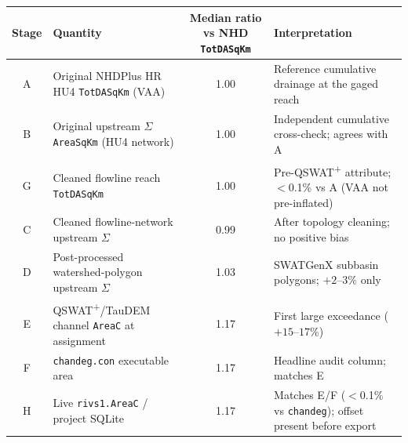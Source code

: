 \begin{tabular}{@{}clcp{5.0cm}@{}}
\toprule
Stage & Quantity & Median ratio vs NHD \texttt{TotDASqKm} & Interpretation \\
\midrule
A & Original NHDPlus HR HU4 \texttt{TotDASqKm} (VAA) & 1.00 & Reference cumulative drainage at the gaged reach \\
B & Original upstream $\Sigma$ \texttt{AreaSqKm} (HU4 network) & 1.00 & Independent cumulative cross-check; agrees with A \\
G & Cleaned flowline reach \texttt{TotDASqKm} & 1.00 & Pre-QSWAT\textsuperscript{+} attribute; $<$0.1\% vs A (VAA not pre-inflated) \\
C & Cleaned flowline-network upstream $\Sigma$ & 0.99 & After topology cleaning; no positive bias \\
D & Post-processed watershed-polygon upstream $\Sigma$ & 1.03 & SWATGenX subbasin polygons; $+2$--$3\%$ only \\
E & QSWAT\textsuperscript{+}/TauDEM channel \texttt{AreaC} at assignment & 1.17 & First large exceedance ($+15$--$17\%$) \\
F & \texttt{chandeg.con} executable area & 1.17 & Headline audit column; matches E \\
H & Live \texttt{rivs1.AreaC} / project SQLite & 1.17 & Matches E/F ($<$0.1\% vs \texttt{chandeg}); offset present before export \\
\bottomrule
\end{tabular}
